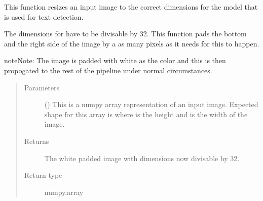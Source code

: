 \documentclass[letterpaper,10pt,english]{sphinxmanual}
\begin{document}

\begin{fulllineitems}
\label{\detokenize{api:readpyne.core.resize}}
This function resizes an input image to the correct dimensions for the
 model that is used for text detection.

The dimensions for  have to be divisable by 32. This function pads
the bottom and the right side of the image by a as many pixels as it needs
for this to happen.

\begin{sphinxadmonition}{note}{Note:}
The image is padded with white as the color and this is then propogated to
the rest of the pipeline under normal circumstances.
\end{sphinxadmonition}
\begin{quote}\begin{description}
\item[{Parameters}] \leavevmode
{} () \textendash{} This is a numpy array representation of an input image. Expected shape
for this array is  where  is the height and  is the
width of the image.

\item[{Returns}] \leavevmode
{} \textendash{} The white padded image with dimensions now divisable by 32.

\item[{Return type}] \leavevmode
numpy.array

\end{description}\end{quote}

\end{fulllineitems}

\end{document}

